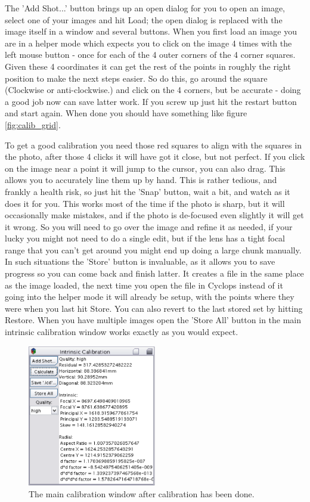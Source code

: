 \documentclass[10pt,a4paper,twoside]{article}
\begin{document}
The 'Add Shot...' button brings up an open dialog for you to open an image, select one of your images and hit Load; the open dialog is replaced with the image itself in a window and several buttons. When you first load an image you are in a helper mode which expects you to click on the image 4 times with the left mouse button - once for each of the 4 outer corners of the 4 corner squares. Given these 4 coordinates it can get the rest of the points in roughly the right position to make the next steps easier. So do this, go around the square (Clockwise or anti-clockwise.) and click on the 4 corners, but be accurate - doing a good job now can save latter work. If you screw up just hit the restart button and start again. When done you should have something like figure \ref{fig:calib_grid}.

To get a good calibration you need those red squares to align with the squares in the photo, after those 4 clicks it will have got it close, but not perfect. If you click on the image near a point it will jump to the cursor, you can also drag. This allows you to accurately line them up by hand. This is rather tedious, and frankly a health risk, so just hit the 'Snap' button, wait a bit, and watch as it does it for you. This works most of the time if the photo is sharp, but it will occasionally make mistakes, and if the photo is de-focused even slightly it will get it wrong. So you will need to go over the image and refine it as needed, if your lucky you might not need to do a single edit, but if the lens has a tight focal range that you can't get around you might end up doing a large chunk manually. In such situations the 'Store' button is invaluable, as it allows you to save progress so you can come back and finish latter. It creates a file in the same place as the image loaded, the next time you open the file in Cyclops instead of it going into the helper mode it will already be setup, with the points where they were when you last hit Store. You can also revert to the last stored set by hitting Restore. When you have multiple images open the 'Store All' button in the main intrinsic calibration window works exactly as you would expect.

\begin{figure}
 \centering
 \includegraphics[width=0.5\textwidth]{screenshots/calib_end}
 \caption{The main calibration window after calibration has been done.}
 \label{fig:calib_done}
\end{figure}
\end{document}

